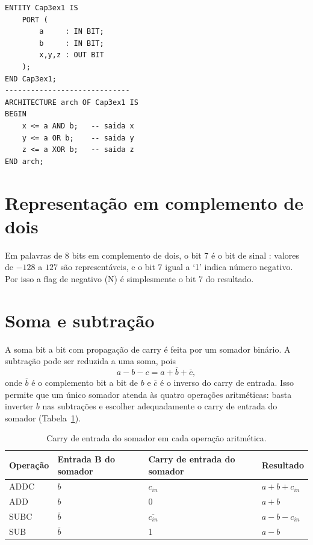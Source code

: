 \break

\begin{lstlisting}[caption={Exemplo de ENTITY e ARCHITECTURE (aula 3).},label={lst:cap3ex1}]
ENTITY Cap3ex1 IS
    PORT (
        a     : IN BIT;
        b     : IN BIT;
        x,y,z : OUT BIT
    );
END Cap3ex1;
-----------------------------
ARCHITECTURE arch OF Cap3ex1 IS
BEGIN
    x <= a AND b;   -- saida x
    y <= a OR b;    -- saida y
    z <= a XOR b;   -- saida z
END arch;
\end{lstlisting}
\vspace{-0.3cm}

\section{Representação em complemento de dois}

Em palavras de 8 bits em complemento de dois, o bit 7 é o bit de sinal \cite{harris2012}: valores de $-128$ a $127$ são representáveis, e o bit 7 igual a `1' indica número negativo. Por isso a flag de negativo (N) é simplesmente o bit 7 do resultado.

\section{Soma e subtração}

A soma bit a bit com propagação de carry é feita por um somador binário. A subtração pode ser reduzida a uma soma, pois
\begin{equation}
  a - b - c = a + \overline{b} + \overline{c},
  \label{eq:sub}
\end{equation}
onde $\overline{b}$ é o complemento bit a bit de $b$ e $\overline{c}$ é o inverso do carry de entrada. Isso permite que um único somador atenda às quatro operações aritméticas: basta inverter $b$ nas subtrações e escolher adequadamente o carry de entrada do somador (Tabela~\ref{tab:cin}).

\begin{table}[htb]
  \centering
  \caption{Carry de entrada do somador em cada operação aritmética.}
  \label{tab:cin}
  \begin{tabular}{llll}
    \hline
    Operação & Entrada B do somador & Carry de entrada do somador & Resultado \\ \hline
    ADDC & $b$ & $c_{in}$ & $a + b + c_{in}$ \\
    ADD  & $b$ & 0 & $a + b$ \\
    SUBC & $\overline{b}$ & $\overline{c_{in}}$ & $a - b - c_{in}$ \\
    SUB  & $\overline{b}$ & 1 & $a - b$ \\ \hline
  \end{tabular}
\end{table}

